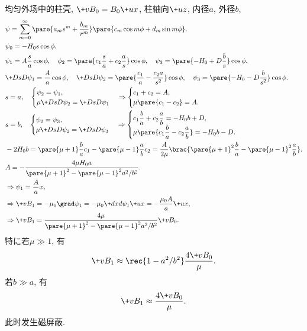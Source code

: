 \documentclass[hidelinks]{ctexart}
\begin{document}
\begin{sample}
    \begin{ex}
        均匀外场中的柱壳, $\+vB_0 = B_0 \+ux$, 柱轴向$\+uz$, 内径$a$, 外径$b$,
        \begin{align*}
            & \psi = \sum_{m=0}^\infty \pare{a_m s^m + \frac{b_m}{r^{m}}}\pare{c_m \cos m\phi + d_m \sin m\phi}. \\
            & \psi_0 = -H_0 s\cos\phi. \\
            & \psi_1 = A\frac{s}{a}\cos \phi,\quad \phi_2 = \pare{c_1 \frac{s}{a} + c_2 \frac{a}{s}}\cos\phi,\quad \psi_3 = \pare{-H_0 + D \frac{b}{s}}\cos\phi. \\
            & \+DsD{\psi_1} = \frac{A}{a}\cos\phi,\quad \+DsD{\psi_2} = \pare{\frac{c_1}{a} - \frac{c_2 a}{s^2}}\cos\phi,\quad \psi_3 = \pare{-H_0 - D\frac{b}{s^2}}\cos\phi. \\
            & s=a,\quad \begin{cases}
                \psi_2 = \psi_1, \\
                \displaystyle \mu \+D{s}D{\psi_2} = \+DsD{\psi_1}
            \end{cases} \Rightarrow \begin{cases}
                c_1 + c_2 = A, \\
                \mu\pare{c_1 - c_2} = A.
            \end{cases} \\
            & s=b,\quad \begin{cases}
                \psi_2 = \psi_3, \\
                \displaystyle \mu \+DsD{\psi_2} = \+DsD{\psi_3}
            \end{cases} \Rightarrow \begin{cases}
                \displaystyle c_1 \frac{b}{a} + c_2 \frac{a}{b} = -H_0 b + D, \\
                \displaystyle \mu \pare{c_1 \frac{b}{a} - c_2 \frac{a}{b}} = -H_0 b - D.
            \end{cases} \\
            & -2H_0 b = \pare{\mu+1}\frac{b}{a} c_1 - \pare{\mu - 1}\frac{a}{b}c_2 = \frac{A}{2\mu} \brac{\pare{\mu+1}^2 \frac{b}{a} - \pare{\mu-1}^2 \frac{a}{b}}. \\
            & A = -\frac{4\mu H_0 a}{\pare{\mu+1}^2 - \pare{\mu-1}^2 a^2/b^2}. \\
            & \Rightarrow \psi_1 = \frac{A}{a}x,\\
            & \Rightarrow \+vB_1 = -\mu_0 \grad \psi_1 = -\mu_0 \+dxd{\psi_1} \+ux = -\frac{\mu_0 A}{a}\+ux, \\
            & \Rightarrow \+vB_1 = \frac{4\mu}{\pare{\mu+1}^2 - \pare{\mu - 1}^2 a^2/b^2}\+vB_0.
        \end{align*}
        特に若$\mu \gg 1$, 有
        \[ \+vB_1 \approx \rec{1-a^2/b^2} \frac{4\+vB_0}{\mu}. \]
        若$b \gg a$, 有
        \[ \+vB_1 \approx \frac{4\+vB_0}{\mu}. \]
        此时发生磁屏蔽.
    \end{ex}
\end{sample}
\end{document}
